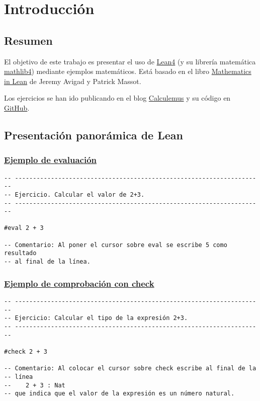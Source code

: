 

\chapter{Introducción}
\label{sec:org13dc82c}

\section{Resumen}
\label{sec:org5dfce73}

El objetivo de este trabajo es presentar el uso de \href{https://leanprover.github.io/lean4/doc/}{Lean4} (y su librería
matemática \href{https://github.com/leanprover-community/mathlib4}{mathlib4}) mediante ejemplos matemáticos. Está basado en el
libro \href{https://leanprover-community.github.io/mathematics\_in\_lean/mathematics\_in\_lean.pdf}{Mathematics in Lean} de Jeremy Avigad y Patrick Massot.

Los ejercicios se han ido publicando en el blog \href{https://jaalonso.github.io/calculemus/}{Calculemus} y su código
en \href{https://github.com/jaalonso/Calculemus2}{GitHub}.

\section{Presentación panorámica de Lean}
\label{sec:org5bc71c1}

\subsection{\href{./src/Introduccion/Ejemplo\_de\_evaluacion.lean}{Ejemplo de evaluación}}
\label{sec:org62c6c89}
\begin{verbatim}
-- ---------------------------------------------------------------------
-- Ejercicio. Calcular el valor de 2+3.
-- ---------------------------------------------------------------------

#eval 2 + 3

-- Comentario: Al poner el cursor sobre eval se escribe 5 como resultado
-- al final de la línea.
\end{verbatim}

\subsection{\href{./src/Introduccion/Ejemplo\_de\_comprobacion\_con\_check.lean}{Ejemplo de comprobación con check}}
\label{sec:org33ff5fb}
\begin{verbatim}
-- ---------------------------------------------------------------------
-- Ejercicio: Calcular el tipo de la expresión 2+3.
-- ---------------------------------------------------------------------

#check 2 + 3

-- Comentario: Al colocar el cursor sobre check escribe al final de la
-- línea
--    2 + 3 : Nat
-- que indica que el valor de la expresión es un número natural.
\end{verbatim}

